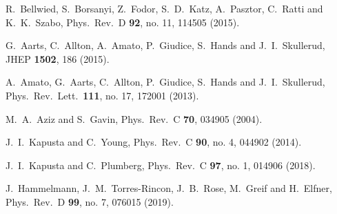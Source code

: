 \begin{thebibliography}{99}
  R.~Bellwied, S.~Borsanyi, Z.~Fodor, S.~D.~Katz, A.~Pasztor, C.~Ratti and K.~K.~Szabo,
  Phys.\ Rev.\ D {\bf 92}, no. 11, 114505 (2015).

  G.~Aarts, C.~Allton, A.~Amato, P.~Giudice, S.~Hands and J.~I.~Skullerud,
  JHEP {\bf 1502}, 186 (2015).

  A.~Amato, G.~Aarts, C.~Allton, P.~Giudice, S.~Hands and J.~I.~Skullerud,
  Phys.\ Rev.\ Lett.\  {\bf 111}, no. 17, 172001 (2013).

  M.~A.~Aziz and S.~Gavin,
  Phys.\ Rev.\ C {\bf 70}, 034905 (2004).

  J.~I.~Kapusta and C.~Young,
  Phys.\ Rev.\ C {\bf 90}, no. 4, 044902 (2014).

  J.~I.~Kapusta and C.~Plumberg,
  Phys.\ Rev.\ C {\bf 97}, no. 1, 014906 (2018).


  J.~Hammelmann, J.~M.~Torres-Rincon, J.~B.~Rose, M.~Greif and H.~Elfner,
  Phys.\ Rev.\ D {\bf 99}, no. 7, 076015 (2019).


\end{thebibliography}
